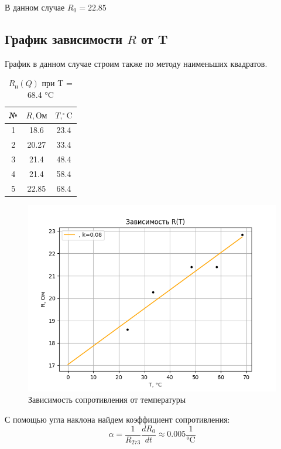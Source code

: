\documentclass[a4paper, 10pt, twocolumn]{article}
\begin{document}
    В данном случае $R_0 = 22.85$
    \subsection{График зависимости $R$ от T}
    График в данном случае строим также по методу наименьших квадратов.
    \begin{table}[H]
        \centering
        \begin{tabular}{|c|c|c|} \hline
        № & $R, \text{Ом}$ & $T, ^\circ\text{C} $ \\ \hline
        1 & 18.6  & 23.4 \\ \hline
        2 & 20.27 & 33.4 \\ \hline
        3 & 21.4  & 48.4 \\ \hline
        4 & 21.4  & 58.4 \\ \hline
        5 & 22.85 & 68.4 \\ \hline
        \end{tabular}
        \caption{$R_\text{н}(Q)$ при T = 68.4 °C}
    \end{table}
    \begin{figure}[H]
        \centering
        \includegraphics[width=1\linewidth]{graphs/figure6.png}
        \begin{center}
            \caption{Зависимость сопротивления от температуры}
        \end{center}
    \end{figure}
    С помощью угла наклона найдем коэффициент сопротивления: $$\alpha = \frac{1}{R_{273}}\frac{dR_0}{dt} \approx 0.005 \frac{1}{\text{°C}} $$
\end{document}
